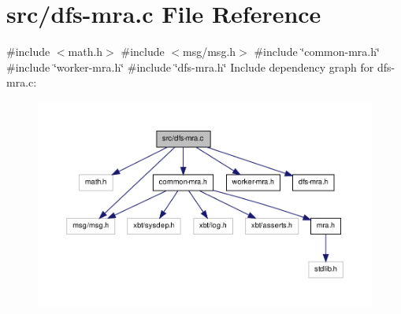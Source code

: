 \hypertarget{dfs-mra_8c}{\section{src/dfs-\/mra.c \-File \-Reference}
\label{dfs-mra_8c}
}
{\ttfamily \#include $<$math.\-h$>$}\*
{\ttfamily \#include $<$msg/msg.\-h$>$}\*
{\ttfamily \#include \char`\"{}common-\/mra.\-h\char`\"{}}\*
{\ttfamily \#include \char`\"{}worker-\/mra.\-h\char`\"{}}\*
{\ttfamily \#include \char`\"{}dfs-\/mra.\-h\char`\"{}}\*
\-Include dependency graph for dfs-\/mra.c\-:\nopagebreak
\begin{figure}[H]
\begin{center}
\leavevmode
\includegraphics[width=350pt]{dfs-mra_8c__incl}
\end{center}
\end{figure}
